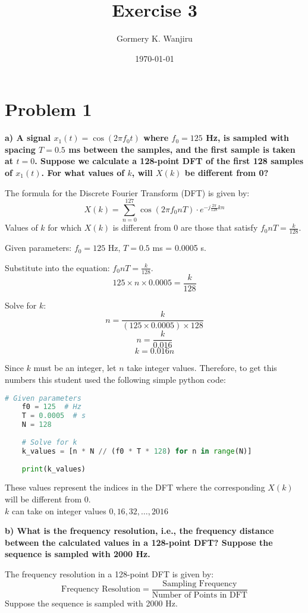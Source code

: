 \documentclass{article}
\title{Exercise 3}
\author{Gormery K. Wanjiru}
\date{\today}
\begin{document}
\maketitle
\section*{Problem 1}

\textbf{a) A signal \(x_1(t) = \cos(2 \pi f_0 t)\) where \(f_0 = 125\) Hz, is sampled with spacing \(T = 0.5\) ms between the samples, and the first sample is taken at \(t = 0\). Suppose we calculate a 128-point DFT of the first 128 samples of \(x_1(t)\). For what values of \(k\), will \(X(k)\) be different from 0?}

The formula for the Discrete Fourier Transform (DFT) is given by:
\[ X(k) = \sum_{n=0}^{127} \cos(2 \pi f_0 n T) \cdot e^{-j \frac{2\pi}{128}kn} \]
Values of \(k\) for which \(X(k)\) is different from 0 are those that satisfy \(f_0 n T = \frac{k}{128}\).

Given parameters: \(f_0 = 125\) Hz, \(T = 0.5\) ms = 0.0005 s.

Substitute into the equation: \(f_0 n T = \frac{k}{128}\).
\[ 125 \times n \times 0.0005 = \frac{k}{128} \]

Solve for \(k\):
\[ n = \frac{k}{(125 \times 0.0005) \times 128} \]
\[ n = \frac{k}{0.016} \]
\[ k = 0.016n \]

Since \(k\) must be an integer, let \(n\) take integer values. Therefore,
to get this numbers this student  used the following simple python code:
\begin{lstlisting}[language=Python, style=pythonstyle, caption={print the array of k values}]
    # Given parameters
    f0 = 125  # Hz
    T = 0.0005  # s
    N = 128
    
    # Solve for k
    k_values = [n * N // (f0 * T * 128) for n in range(N)]
    
    print(k_values)
\end{lstlisting}
These values represent the indices in the DFT where the corresponding \(X(k)\) will be different from 0.\\
\(k\) can take on integer values \(0, 16, 32, \ldots, 2016\)



\textbf{b) What is the frequency resolution, i.e., the frequency distance between the calculated values in a 128-point DFT? Suppose the sequence is sampled with 2000 Hz.}

The frequency resolution in a 128-point DFT is given by:
\[ \text{Frequency Resolution} = \frac{\text{Sampling Frequency}}{\text{Number of Points in DFT}} \]
Suppose the sequence is sampled with 2000 Hz.
\end{document}
